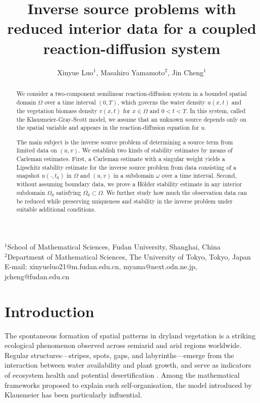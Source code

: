 \documentclass[12pt]{amsart}
\title
[]
{Inverse source problems with reduced interior data for a coupled reaction-diffusion system}
\author{Xinyue Luo$^{1}$, Masahiro Yamamoto$^{2}$, Jin Cheng$^{1}$}
\theoremstyle{plain}
\theoremstyle{definition}
\theoremstyle{remark}
\begin{document}
\maketitle


\begin{center}
\footnotesize
$^{1}$School of Mathematical Sciences, Fudan University, Shanghai, China\\
$^{2}$Department of Mathematical Sciences, The University of Tokyo, Tokyo, Japan\\[0.3em]
E-mail: xinyueluo21@m.fudan.edu.cn, myama@next.odn.ne.jp, jcheng@fudan.edu.cn
\end{center}
\begin{abstract}
We consider a two-component semilinear reaction-diffusion system in a bounded spatial domain $\Omega$ over a time interval $(0,T)$, which governs the water density $u(x,t)$ and the vegetation biomass density $v(x,t)$ for $x\in\Omega$ and $0<t<T$. In this system, called the Klausmeier-Gray-Scott model, we assume that an unknown source depends only on the spatial variable and appears in the reaction-diffusion equation for $u$.

The main subject is the inverse source problem of determining a source term from limited data on $(u,v)$.
We establish two kinds of stability estimates by means of Carleman estimates. First, a Carleman estimate with a singular weight yields a Lipschitz stability estimate for the inverse source problem from data consisting of a snapshot $u(\cdot,t_0)$ in $\Omega$ and $(u,v)$ in a subdomain $\omega$ over a time interval. Second, without assuming boundary data, we prove a H\"older stability estimate in any interior subdomain $\Omega_0$ satisfying $\overline{\Omega_0}\subset\Omega$. We further study how much the observation data can be reduced while preserving uniqueness and stability in the inverse problem under suitable additional conditions.
\end{abstract}




\section{Introduction}\label{sec:intro}


The spontaneous formation of spatial patterns in dryland vegetation is a
striking ecological phenomenon observed across semiarid and arid regions
worldwide.
Regular structures---stripes, spots, gaps, and labyrinths---emerge from the
interaction between water availability and plant growth, and serve as
indicators of ecosystem health and potential desertification
\cite{rietkerk2008regular}.
Among the mathematical frameworks proposed to explain such self-organisation,
the model introduced by Klausmeier \cite{klausmeier1999regular} has been
particularly influential.
\end{document}
